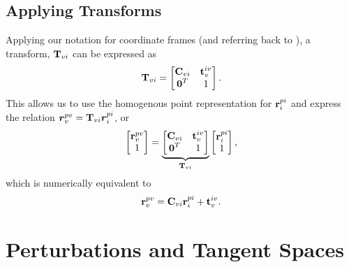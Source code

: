 \subsection{Applying Transforms}
Applying our notation for coordinate frames (and referring back to ), a transform, $\boldsymbol{\mathbf{T}}_{vi}$ can be expressed as 
\begin{equation}
\boldsymbol{\mathbf{T}}_{vi} = \begin{bmatrix} \boldsymbol{\mathbf{C}}_{vi} & \boldsymbol{\mathbf{t}}_v^{iv} \\ \boldsymbol{\mathbf{0}}^T & 1 \end{bmatrix}.
\end{equation}
This allows us to use the homogenous point representation for $\boldsymbol{\mathbf{r}}^{pi}_i$ and express the relation $\boldsymbol{r}^{pv}_v = \boldsymbol{\mathbf{T}}_{vi} \boldsymbol{r}^{pi}_i$, or
\begin{equation}
	\begin{bmatrix} \boldsymbol{\mathbf{r}}^{pv}_v \\ 1 \end{bmatrix} = \underbrace{\begin{bmatrix} \boldsymbol{\mathbf{C}}_{vi} & \boldsymbol{\mathbf{t}}_v^{iv} \\ \boldsymbol{\mathbf{0}}^T & 1 \end{bmatrix}}_{\boldsymbol{\mathbf{T}}_{vi}} \begin{bmatrix} \boldsymbol{\mathbf{r}}^{pi}_i \\ 1 \end{bmatrix},
\end{equation}
which is numerically equivalent to  
\begin{equation}
 \boldsymbol{\mathbf{r}}^{pv}_v =  \boldsymbol{\mathbf{C}}_{vi} \boldsymbol{\mathbf{r}}^{pi}_i + \boldsymbol{\mathbf{t}}_v^{iv}.  
 \end{equation}

\section{Perturbations and Tangent Spaces}

